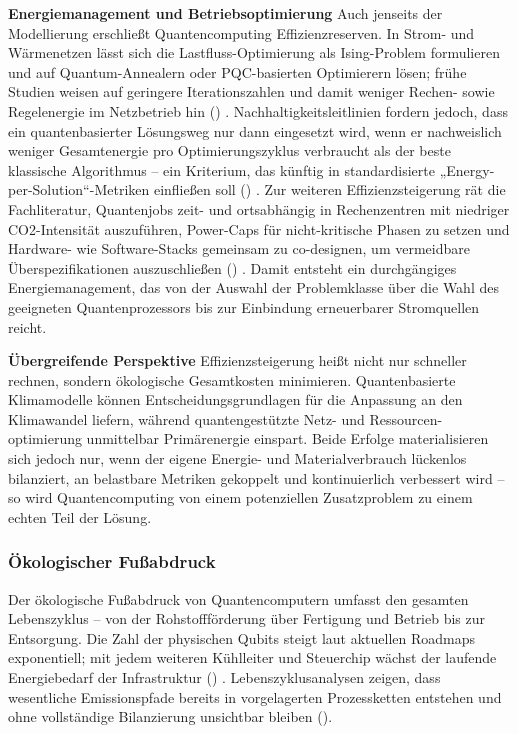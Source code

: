 \textbf{Energiemanagement und Betriebsoptimierung}
Auch jenseits der Modellierung erschließt Quantencomputing Effizienzreserven. In Strom- und Wärmenetzen lässt sich die Lastfluss-Optimierung als Ising-Problem formulieren und auf Quantum-Annealern oder PQC-basierten Optimierern lösen; frühe Studien weisen auf geringere Iterationszahlen und damit weniger Rechen- sowie Regelenergie im Netzbetrieb hin (\cite{rootQuantumTechnologiesContext2025}) . Nachhaltigkeitsleitlinien fordern jedoch, dass ein quantenbasierter Lösungsweg nur dann eingesetzt wird, wenn er nachweislich weniger Gesamtenergie pro Optimierungszyklus verbraucht als der beste klassische Algorithmus – ein Kriterium, das künftig in standardisierte „Energy-per-Solution“-Metriken einfließen soll (\cite{rootQuantumTechnologiesContext2025}) .
Zur weiteren Effizienzsteigerung rät die Fachliteratur, Quantenjobs zeit- und ortsabhängig in Rechenzentren mit niedriger CO2-Intensität auszuführen, Power-Caps für nicht-kritische Phasen zu setzen und Hardware- wie Software-Stacks gemeinsam zu co-designen, um vermeidbare Überspezifikationen auszuschließen (\cite{rootQuantumTechnologiesContext2025}) . Damit entsteht ein durchgängiges Energiemanagement, das von der Auswahl der Problemklasse über die Wahl des geeigneten Quantenprozessors bis zur Einbindung erneuerbarer Stromquellen reicht.

\textbf{Übergreifende Perspektive}
Effizienzsteigerung heißt nicht nur schneller rechnen, sondern ökologische Gesamtkosten minimieren. Quantenbasierte Klimamodelle können Entscheidungsgrundlagen für die Anpassung an den Klimawandel liefern, während quantengestützte Netz- und Ressourcen-optimierung unmittelbar Primärenergie einspart. Beide Erfolge materialisieren sich jedoch nur, wenn der eigene Energie- und Materialverbrauch lückenlos bilanziert, an belastbare Metriken gekoppelt und kontinuierlich verbessert wird – so wird Quantencomputing von einem potenziellen Zusatzproblem zu einem echten Teil der Lösung.

\subsubsection{Ökologischer Fußabdruck}
Der ökologische Fußabdruck von Quantencomputern umfasst den gesamten Lebenszyklus – von der Rohstoffförderung über Fertigung und Betrieb bis zur Entsorgung. Die Zahl der physischen Qubits steigt laut aktuellen Roadmaps exponentiell; mit jedem weiteren Kühlleiter und Steuerchip wächst der laufende Energiebedarf der Infrastruktur (\cite{schwabeOpportunitiesChallengesQuantum2025a}) . Lebenszyklusanalysen zeigen, dass wesentliche Emissionspfade bereits in vorgelagerten Prozessketten entstehen und ohne vollständige Bilanzierung unsichtbar bleiben (\cite{rootQuantumTechnologiesContext2025}).

